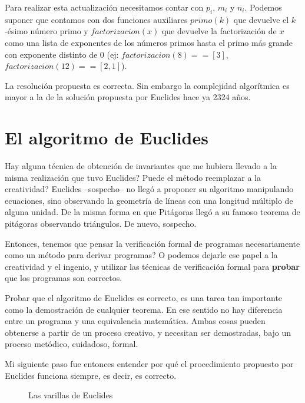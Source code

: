 \documentclass[12pt, a4paper, openany, fleqn]{book}
\begin{document}
    Para realizar esta actualización necesitamos contar con $p_{i}$, $m_{i}$ y $n_{i}$.
    Podemos suponer que contamos con dos funciones auxiliares $primo(k)$ que devuelve el $k$-ésimo número primo y $factorizacion(x)$ que devuelve la factorización de $x$ como una lista de exponentes de los números primos hasta el primo más grande con exponente distinto de 0 (ej: $factorizacion(8) == [3]$, $factorizacion(12) == [2,1]$).

    La resolución propuesta es correcta. Sin embargo la complejidad algorítmica es mayor a la de la solución propuesta por Euclides hace ya 2324 años.

    \section{El algoritmo de Euclides}
    Hay alguna técnica de obtención de invariantes que me hubiera llevado a la misma realización que tuvo Euclides? Puede el método reemplazar a la creatividad?
    Euclides --sospecho-- no llegó a proponer su algoritmo manipulando ecuaciones, sino observando la geometría de líneas con una longitud múltiplo de alguna unidad. De la misma forma en que Pitágoras llegó a su famoso teorema de pitágoras observando triángulos. De nuevo, sospecho.

    Entonces, tenemos que pensar la verificación formal de programas necesariamente como un método para derivar programas? O podemos dejarle ese papel a la creatividad y el ingenio, y utilizar las técnicas de verificación formal para \textbf{probar} que los programas son correctos.

    Probar que el algoritmo de Euclides es correcto, es una tarea tan importante como la demostración de cualquier teorema. En ese sentido no hay diferencia entre un programa y una equivalencia matemática. Ambas cosas pueden obtenerse a partir de un proceso creativo, y necesitan ser demostradas, bajo un proceso metódico, cuidadoso, formal.

    Mi siguiente paso fue entonces entender por qué el procedimiento propuesto por Euclides funciona siempre, es decir, es correcto.


    \begin{figure}[h]
        \centering
        \caption{Las varillas de Euclides} \label{varillas_euclides}
    \end{figure}
\end{document}
